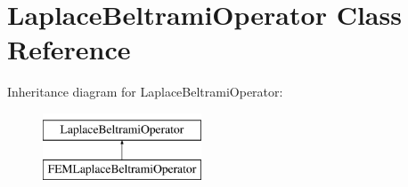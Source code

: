\hypertarget{class_laplace_beltrami_operator}{}\section{Laplace\+Beltrami\+Operator Class Reference}
\label{class_laplace_beltrami_operator}
Inheritance diagram for Laplace\+Beltrami\+Operator\+:\begin{figure}[H]
\begin{center}
\leavevmode
\includegraphics[height=2.000000cm]{class_laplace_beltrami_operator}
\end{center}
\end{figure}
